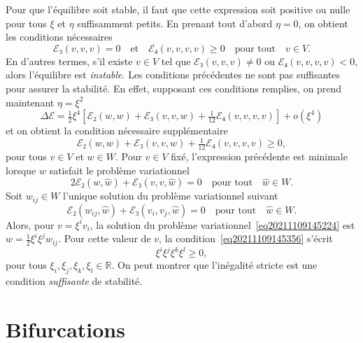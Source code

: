 \documentclass[12pt, final]{amsart}
\theoremstyle{definition}
\begin{document}
Pour que l'équilibre soit stable, il faut que cette expression soit positive ou nulle pour tous \(ξ\) et \(η\) suffisamment petits. En prenant tout d'abord \(η = 0\), on obtient les conditions nécessaires \begin{equation}
  \label{eq20211108164416} ℰ₃(v, v, v) = 0 \quad \text{et} \quad
  ℰ₄(v, v, v, v) \geq 0 \quad \text{pour tout} \quad v∈V.
\end{equation}
En d'autres termes, s'il existe \(v∈V\) tel que \(ℰ₃(v, v, v) \neq 0\) ou \(ℰ₄(v, v, v, v) < 0\), alors l'équilibre est \emph{instable}. Les conditions précédentes ne sont pas suffisantes pour assurer la stabilité. En effet, supposant ces conditions remplies, on prend maintenant \(η = ξ^2\)
\begin{equation}
  \Delta ℰ= \tfrac{1}{2} ξ^4  \left[ ℰ₂(w, w)
  +ℰ₃(v, v, w) + \tfrac{1}{12} ℰ₄(v, v, v, v) \right]
  + o(ξ^4)
\end{equation}
et on obtient la condition nécessaire supplémentaire
\begin{equation}
  \label{eq20211109145356} ℰ₂(w, w) +ℰ₃(v, v, w) +
  \tfrac{1}{12} ℰ₄(v, v, v, v) \geq 0,
\end{equation}
pour tous \(v∈V\) et \(w∈W\). Pour \(v∈V\) fixé, l'expression précédente est minimale lorsque \(w\) satisfait le problème variationnel
\begin{equation}
  \label{eq20211109145224} 2ℰ₂(w, \hat{w}) +ℰ₃(v, v,
  \hat{w}) = 0 \quad \text{pour tout} \quad \hat{w}∈W.
\end{equation}
Soit \(w_{i  j}∈W\) l'unique solution du problème variationnel suivant
\begin{equation}
  \label{eq:pbvar wij} ℰ₂(w_{i  j}, \hat{w})
  +ℰ₃(v_i, v_j, \hat{w}) = 0 \quad \text{pour tout} \quad \hat{w}
 ∈W.
\end{equation}
Alors, pour \(v = ξ^i v_i\), la solution du problème variationnel~\eqref{eq20211109145224} est \(w = \tfrac{1}{2} ξ^i ξ^j w_{ij}\). Pour cette valeur de \(v\), la condition~\eqref{eq20211109145356} s'écrit
\begin{equation}
  [ℰ₄(v_i, v_j, v_k, v_l) - 3ℰ₂(w_{i  j}, w_{k
   l})] ξ^i ξ^j ξ^k ξ^l \geq 0,
\end{equation}
pour tous \(ξ_i, ξ_j, ξ_k, ξ_l∈\mathbb{R}\). On peut montrer que l'inégalité stricte est une condition \emph{suffisante} de stabilité.

\section{Bifurcations}
\end{document}
